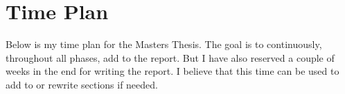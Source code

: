 \documentclass{../kththesis}
\begin{document}
\section{Time Plan}
Below is my time plan for the Masters Thesis. The goal is to continuously, throughout all phases, add to the report. But I have also reserved a couple of weeks in the end for writing the report. I believe that this time can be used to add to or rewrite sections if needed. \\ \\

\begin{ganttchart}{1}{20}
	 \\
	\\
	 \\
	 \\
	 \\
	 \\
	 \\
	 \\
\end{ganttchart}

\printbibliography[heading=bibintoc] %
\end{document}
